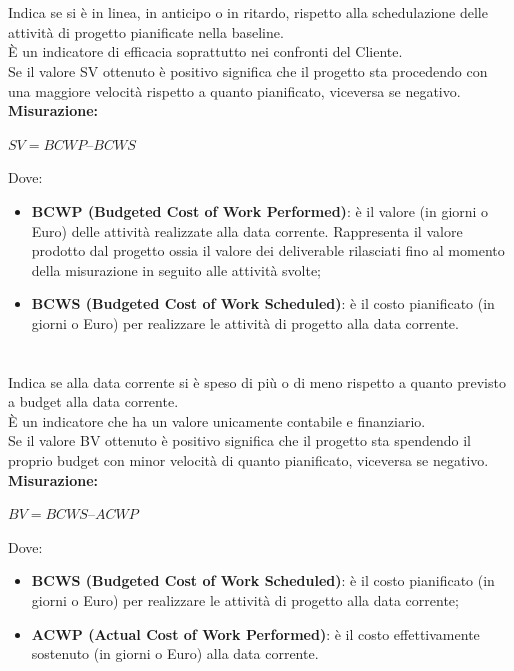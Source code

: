 \documentclass[PianoDiQualifica.tex]{subfiles}
\begin{document}
\paragraph{}
\\
Indica se si è in linea, in anticipo o in ritardo, rispetto alla schedulazione delle attività di progetto pianificate nella baseline.\\
È un indicatore di efficacia soprattutto nei confronti del Cliente. \\
Se il valore SV ottenuto è positivo significa che il progetto sta procedendo con una maggiore velocità rispetto a quanto pianificato, viceversa se negativo.\\
\textbf{Misurazione:}
\begin{center}
	 $ SV = BCWP – BCWS $
\end{center}
Dove: \begin{itemize}
	\item \textbf{BCWP (Budgeted Cost of Work Performed)}: è il valore (in giorni o Euro) delle attività realizzate alla data corrente.
	Rappresenta il valore prodotto dal progetto ossia il valore dei deliverable rilasciati fino al momento della misurazione in seguito alle attività svolte;
	\item \textbf{BCWS (Budgeted Cost of Work Scheduled)}: è il costo pianificato (in giorni o Euro) per realizzare le attività di progetto alla data corrente.
\end{itemize}


\paragraph{}
\\
Indica se alla data corrente si è speso di più o di meno rispetto a quanto previsto a budget alla data corrente.\\
È un indicatore che ha un valore unicamente contabile e finanziario.\\
Se il valore BV ottenuto è positivo significa che il progetto sta spendendo il proprio budget con minor velocità di quanto pianificato, viceversa se negativo.\\

\textbf{Misurazione:}
\begin{center}
	$ BV = BCWS – ACWP $
\end{center}
Dove: \begin{itemize}
	\item \textbf{BCWS (Budgeted Cost of Work Scheduled)}: è il costo pianificato (in giorni o Euro) per realizzare le attività di progetto alla data corrente;
	\item \textbf{ACWP (Actual Cost of Work Performed)}: è il costo effettivamente sostenuto (in giorni o Euro) alla data corrente.
\end{itemize}
\end{document}
